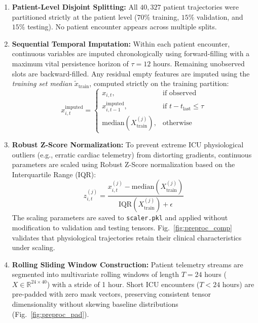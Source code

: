 \documentclass[journal,twocolumn,10pt]{IEEEtran}
\begin{document}
\begin{enumerate}
    \item \textbf{Patient-Level Disjoint Splitting:} All $40,327$ patient trajectories were partitioned strictly at the patient level ($70\%$ training, $15\%$ validation, and $15\%$ testing). No patient encounter appears across multiple splits.
    \item \textbf{Sequential Temporal Imputation:} Within each patient encounter, continuous variables are imputed chronologically using forward-filling with a maximum vital persistence horizon of $\tau = 12$ hours. Remaining unobserved slots are backward-filled. Any residual empty features are imputed using the \textit{training set median} $\tilde{x}_{\text{train}}$, computed strictly on the training partition:
    \begin{equation}
    x_{i, t}^{\text{imputed}} = \begin{cases}
    x_{i, t}, & \text{if observed} \\
    x_{i, t-1}^{\text{imputed}}, & \text{if } t - t_{\text{last}} \le \tau \\
    \text{median}(X_{\text{train}}^{(j)}), & \text{otherwise}
    \end{cases}
    \end{equation}
    \item \textbf{Robust Z-Score Normalization:} To prevent extreme ICU physiological outliers (e.g., erratic cardiac telemetry) from distorting gradients, continuous parameters are scaled using Robust Z-Score normalization based on the Interquartile Range (IQR):
    \begin{equation}
    z_{i, t}^{(j)} = \frac{x_{i, t}^{(j)} - \text{median}(X_{\text{train}}^{(j)})}{\text{IQR}(X_{\text{train}}^{(j)}) + \epsilon}
    \end{equation}
    The scaling parameters are saved to \texttt{scaler.pkl} and applied without modification to validation and testing tensors. Fig.~\ref{fig:preproc_comp} validates that physiological trajectories retain their clinical characteristics under scaling.
    \item \textbf{Rolling Sliding Window Construction:} Patient telemetry streams are segmented into multivariate rolling windows of length $T = 24$ hours ($X \in \mathbb{R}^{24 \times 40}$) with a stride of 1 hour. Short ICU encounters ($T < 24$ hours) are pre-padded with zero mask vectors, preserving consistent tensor dimensionality without skewing baseline distributions (Fig.~\ref{fig:preproc_pad}).
\end{enumerate}
\end{document}
